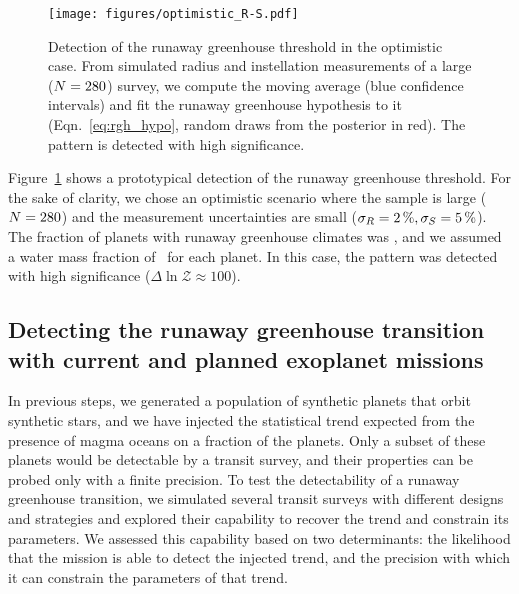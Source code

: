 \documentclass[modern]{aastex631}
\begin{document}
\begin{figure}[ht!]
    \begin{centering}
        \texttt{[image: figures/optimistic\_R-S.pdf]}
        \caption{
        Detection of the runaway greenhouse threshold in the optimistic case.
        From simulated radius and instellation measurements of a large ($N = 280$) survey, we compute the moving average (blue confidence intervals) and fit the runaway greenhouse hypothesis to it (Eqn.~\ref{eq:rgh_hypo}, random draws from the posterior in red).
            The pattern is detected with high significance.
        }
        \label{fig:optimistic_R-S}
    \end{centering}
\end{figure}
Figure~\ref{fig:optimistic_R-S} shows a prototypical detection of the runaway greenhouse threshold.
For the sake of clarity, we chose an optimistic scenario where the sample is large ($N = 280$) and the measurement uncertainties are small ($\sigma_{R} = \SI{2}{\percent}, \sigma_{S} = \SI{5}{\percent}$).
The fraction of planets with runaway greenhouse climates was \frgh, and we assumed a water mass fraction of \wrr\ for each planet.
In this case, the pattern was detected with high significance ($\Delta \ln \mathcal{Z} \approx 100$).





\subsection{Detecting the runaway greenhouse transition with current and planned exoplanet missions}
In previous steps, we generated a population of synthetic planets that orbit synthetic stars, and we have injected the statistical trend expected from the presence of magma oceans on a fraction of the planets.
Only a subset of these planets would be detectable by a transit survey, and their properties can be probed only with a finite precision.
To test the detectability of a runaway greenhouse transition, we simulated several transit surveys with different designs and strategies and explored their capability to recover the trend and constrain its parameters.
We assessed this capability based on two determinants: the likelihood that the mission is able to detect the injected trend, and the precision with which it can constrain the parameters of that trend.
\end{document}
